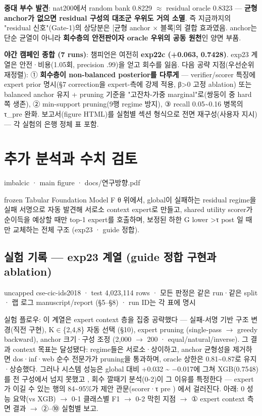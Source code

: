 \textbf{중대 부수 발견}: nat200에서 random bank 0.8229 \ensuremath{\approx} residual oracle 0.8323 — \textbf{균형 anchor가 없으면 residual 구성의 대조군 우위도 거의 소멸}. 즉 지금까지의 "residual 신호"(Gate-1)의 상당분은 [균형 anchor × 블록]의 결합 효과였음. anchor는 단순 균열이 아니라 \textbf{회수층의 안전판이자 oracle 우위의 공동 원천}인 양면 부품.

\textbf{야간 캠페인 종합 (7 runs)}: 챔피언은 여전히 \textbf{exp22c (+\allowbreak{}0.063, 0.7428)}. exp23 계열은 안전·비용(1.05회, precision .99)을 얻고 회수를 잃음. 다음 공략 지점(우선순위 재정렬): ① \textbf{회수층이 non-balanced posterior를 다루게} — verifier/\allowbreak{}scorer 특징에 expert prior 명시(§7 correction을 expert-측에 강제 적용, β>0 고정 ablation) 또는 balanced anchor 유지 +\allowbreak{} pruning 기준을 "고잔차-가중 marginal"로(쌍둥이 중 hard 쪽 생존), ② min-support pruning(9행 regime 방지), ③ recall 0.05\textasciitilde{}0.16 병목의 τ\_\allowbreak{}pre 완화. 보고서(figure HTML)를 실험별 섹션 형식으로 전면 재구성(사용자 지시) — 각 실험의 은행 정체 표 포함.



\section{추가 분석과 수치 검토}
imbalcic · main figure · docs/\allowbreak{}연구방향.pdf

frozen Tabular Foundation Model F θ 위에서, global이 실패하는 residual regime을 실패 서명으로 자동 발견해 서로소 context expert로 만들고, shared utility scorer가 순이득을 예상할 때만 top-1 expert를 호출하며, 보정된 하한 G lower >τ post 일 때만 교체하는 전체 구조 (exp23 · guide 정합).

\subsection*{실험 기록 — exp23 계열 (guide 정합 구현과 ablation)}
uncapped cse-cic-ids2018 · test 4,023,114 rows · 모든 판정은 같은 run·같은 split · 랩 로그 manuscript/\allowbreak{}report (§5–§8) · run ID는 각 표에 명시

실험 플로우: 이 계열은 expert context 층을 집중 공략했다 — 실패-서명 기반 구조 변경(직전 구현), K\ensuremath{\in}\{2,4,8\} 자동 선택 (§10), expert pruning (single-pass  \ensuremath{\rightarrow}  greedy backward), anchor 크기·구성 조정 (2,000 \ensuremath{\rightarrow} 200 · equal/\allowbreak{}natural/\allowbreak{}inverse). 그 결과 context 목표는 달성됐다: regime들은 서로소·상이하고, anchor 균형성을 제거하면 dos·inf·web 순수 전문가가 pruning을 통과하며, oracle 상한은 0.81\textasciitilde{}0.87로 유지·상승했다. 그러나 시스템 성능은 global 대비 +\allowbreak{}0.032 \textasciitilde{} −0.017에 그쳐 XGB(0.7548)를 전 구성에서 넘지 못했고 , 회수 깔때기 분석(0-2)이 그 이유를 특정한다 — expert가 이길 수 있는 행의 84\textasciitilde{}95\%가 제안 관문(scorer·τ pre ) 에서 걸러진다. 아래: 0 성능 요약(vs XGB)  \ensuremath{\rightarrow}  0-1 클래스별 F1  \ensuremath{\rightarrow}  0-2 막힌 지점  \ensuremath{\rightarrow}  ① expert context 측면 결과  \ensuremath{\rightarrow}  ②–⑩ 실험별 보고.

